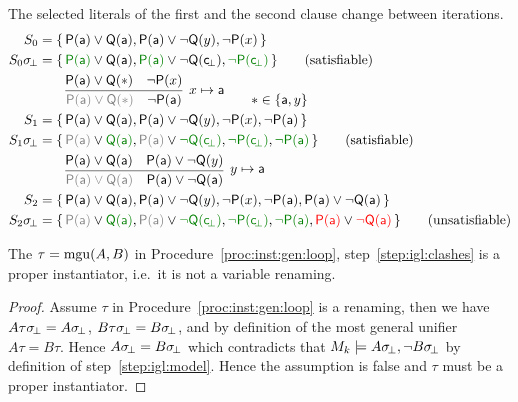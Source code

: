 \begin{example} The selected literals of the first and the second clause change between iterations.
\begin{align*}
S_0 &= \{ \,
	\mP(\ma)\lor\mQ(\ma),
	\mP(\ma)\lor\lnot\mQ(y),
	\lnot\mP(x)
 \, \}
\\
S_0\subsbot &= \{ \,
	{\colHi\mP(\ma)}\lor\mQ(\ma),
	{\colHi\mP(\ma)}\lor\lnot\mQ(\consbot),
	{\colHi\lnot\mP(\consbot)}
 \, \}
\tag{satisfiable}
\\
&\qquad\infer[
	x\mapsto\ma
	]{
		{\colG \mP(\ma)\lor\mQ(\ast)}\quad\lnot\mP(\ma)
	}{
		\mP(\ma)\lor\mQ(\ast) & \lnot\mP(x)
	}
\tag*{\( \ast\in \{ \ma,y\} \)}
\\
S_1 &= \{ \,
	\mP(\ma)\lor\mQ(\ma),
	\mP(\ma)\lor\lnot\mQ(y),
	\lnot\mP(x),
	\lnot\mP(\ma)
 \, \}
\\
S_1\subsbot &= \{ \,
	{\colG\mP(\ma)}\lor{\colHi\mQ(\ma)},
	{\colG\mP(\ma)}\lor{\colHi\lnot\mQ(\consbot)},
	{\colHi\lnot\mP(\consbot)},
	{\colHi\lnot\mP(\ma)}
 \, \}
\tag{satisfiable}
\\
&\qquad\infer[
y\mapsto\ma
]{
	{\colG \mP(\ma)\lor\mQ(\ma)}\quad\mP(\ma)\lor\lnot\mQ(\ma)
}{
	\mP(\ma)\lor\mQ(\ma) & \mP(\ma)\lor\lnot\mQ(y)
}
\\
S_2 &= \{ \,
\mP(\ma)\lor\mQ(\ma),
\mP(\ma)\lor\lnot\mQ(y),
\lnot\mP(x),
\lnot\mP(\ma),
\mP(\ma)\lor\lnot\mQ(\ma)
 \, \}
\\
S_2\subsbot &= \{ \,
{\colG\mP(\ma)}\lor{\colHi\mQ(\ma)},
{\colG\mP(\ma)}\lor{\colHi\lnot\mQ(\consbot)},
{\colHi\lnot\mP(\consbot)},
{\colHi\lnot\mP(\ma)},
{\colLo\mP(\ma)}\lor{\colLo\lnot\mQ(\ma)}
 \, \}
\tag{unsatisfiable}
\end{align*}
\end{example}

\begin{lemma}
	The \( \tau = \operatorname{mgu}(A,B) \) in Procedure~\ref{proc:inst:gen:loop},
	step~\ref{step:igl:clashes} is a proper instantiator,
	i.e.~it is not a variable renaming.
\end{lemma}
\begin{proof}
	Assume \( \tau \) in Procedure~\ref{proc:inst:gen:loop}
	is a renaming, then we have
	\( A\tau\sigma \!_\bot = A\sigma \!_\bot \),
	\( B\tau\sigma \!_\bot = B\sigma \!_\bot \),
	and by definition of the most general unifier \( A\tau = B\tau \).
	Hence \( A\sigma \!_\bot = B\sigma \!_\bot \) which contradicts that
	\( M_k\models A\sigma \!_\bot, \lnot B\sigma \!_\bot \)
	by definition of step~\ref{step:igl:model}.
	Hence the assumption is false and \( \tau \) must be a proper instantiator.
\end{proof}





